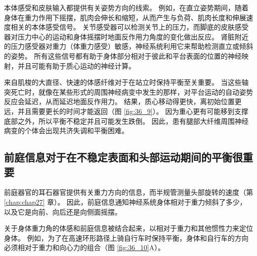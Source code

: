 本体感受和皮肤输入都提供有关姿势方向的线索。
例如，在直立姿势期间，随着身体在重力作用下摇摆，肌肉会伸长和缩短，从而产生与负荷、肌肉长度和伸展速度相关的本体感受信号。
关节感受器可以检测关节上的压力，而脚底的皮肤感受器对压力中心的运动和身体摇摆时地面反作用力角度的变化做出反应。
肾脏附近的压力感受器对重力（体重力感受）敏感，神经系统利用它来帮助检测直立或倾斜的姿势。
所有这些信号都有助于身体部分相对于彼此和平台表面的位置的神经映射，并且可能有助于质心运动的神经计算。


来自肌梭的大直径、快速的体感纤维对于在站立时保持平衡至关重要。
当这些轴突死亡时，就像在某些形式的周围神经病变中发生的那样，对平台运动的自动姿势反应会延迟，从而延迟地面反作用力。
结果，质心移动得更快，离初始位置更远，并且需要更长的时间才能返回（图 \ref{fig:36_9}）。
因为重心更有可能移到支撑底部之外，所以平衡不稳定并且可能发生跌倒。
因此，患有腿部大纤维周围神经病变的个体会出现共济失调和平衡困难。



\subsection{前庭信息对于在不稳定表面和头部运动期间的平衡很重要}

前庭器官的耳石器官提供有关重力方向的信息，而半规管测量头部旋转的速度（第 \ref{chap:chap27} 章）。
因此，前庭信息通知神经系统身体相对于重力倾斜了多少，以及它是向前、向后还是向侧面摇摆。


关于身体重力角的体感和前庭信息被结合起来，以相对于重力和其他惯性力来定位身体。
例如，为了在高速环形路径上骑自行车时保持平衡，身体和自行车的方向必须相对于重力和向心力的组合（图 \ref{fig:36_10}A）。


